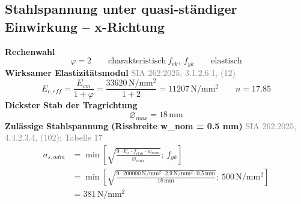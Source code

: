 \documentclass[11pt,a4paper]{article}
\newcommand{\normref}[1]{{\small\textcolor{gray}{#1}}}
\begin{document}
\subsection{Stahlspannung unter quasi-ständiger Einwirkung – x-Richtung}
\noindent\textbf{Rechenwahl}
\begin{equation*}
\varphi = 2 \qquad \text{charakteristisch}\ f_{ck},\ f_{yk} \qquad \text{elastisch}
\end{equation*}
\noindent\textbf{Wirksamer Elastizitätsmodul} \hfill \normref{SIA 262:2025, 3.1.2.6.1, (12)}
\begin{equation*}
E_{c,eff} = \frac{E_{cm}}{1 + \varphi} = \frac{33620\,\mathrm{N}/\mathrm{mm}^{2}}{1 + 2} = 11207\,\mathrm{N}/\mathrm{mm}^{2} \qquad n = 17.85
\end{equation*}
\noindent\textbf{Dickster Stab der Tragrichtung}
\begin{equation*}
\varnothing_{max} = 18\,\mathrm{mm}
\end{equation*}
\noindent\textbf{Zulässige Stahlspannung (Rissbreite w\_nom = 0.5 mm)} \hfill \normref{SIA 262:2025, 4.4.2.3.4, (102); Tabelle 17}
\begin{equation*}
\begin{aligned}
  \sigma_{s,adm} &= \min\left[\sqrt{\frac{9 \cdot E_s \cdot f_{ctm} \cdot w_{nom}}{\varnothing_{max}}};\ f_{yk}\right] \\
  &= \min\left[\sqrt{\frac{9 \cdot 200000\,\mathrm{N}/\mathrm{mm}^{2} \cdot 2.9\,\mathrm{N}/\mathrm{mm}^{2} \cdot 0.5\,\mathrm{mm}}{18\,\mathrm{mm}}};\ 500\,\mathrm{N}/\mathrm{mm}^{2}\right] \\
  &= 381\,\mathrm{N}/\mathrm{mm}^{2}
\end{aligned}
\end{equation*}
\end{document}
